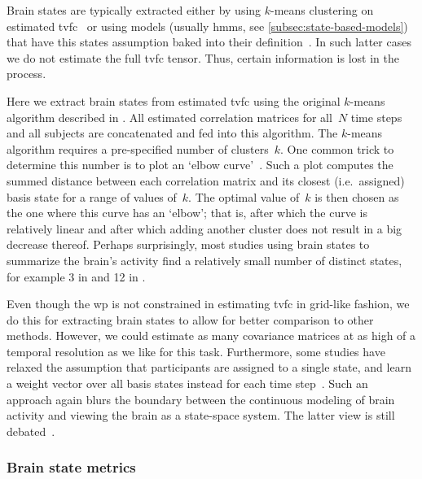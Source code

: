 Brain states are typically extracted either by using $k$-means clustering on estimated \gls{tvfc}~\parencite[see e.g.][]{Allen2014, Abrol2016, Zhi2018, Hakimdavoodi2020} or using models (usually \glspl{hmm}, see \cref{subsec:state-based-models}) that have this states assumption baked into their definition~\parencite{Lurie2020}.
In such latter cases we do not estimate the full \gls{tvfc} tensor.
Thus, certain information is lost in the process.

Here we extract brain states from estimated \gls{tvfc} using the original $k$-means algorithm described in \textcite{Lloyd1982}.
All estimated correlation matrices for all~$N$ time steps and all subjects are concatenated and fed into this algorithm.
The $k$-means algorithm requires a pre-specified number of clusters~$k$.
One common trick to determine this number is to plot an `elbow curve'~\parencite[see e.g.][chapter 5.5]{Everitt2011}.
Such a plot computes the summed distance between each correlation matrix and its closest (i.e.~assigned) basis state for a range of values of~$k$.
The optimal value of~$k$ is then chosen as the one where this curve has an `elbow'; that is, after which the curve is relatively linear and after which adding another cluster does not result in a big decrease thereof.
%
Perhaps surprisingly, most studies using brain states to summarize the brain's activity find a relatively small number of distinct states, for example 3 in \textcite{Choe2017, Dini2021} and 12 in \textcite{Vidaurre2017}.

Even though the \gls{wp} is not constrained in estimating \gls{tvfc} in grid-like fashion, we do this for extracting brain states to allow for better comparison to other methods.
However, we could estimate as many covariance matrices at as high of a temporal resolution as we like for this task.
%
Furthermore, some studies have relaxed the assumption that participants are assigned to a single state, and learn a weight vector over all basis states instead for each time step~\parencite{Leonardi2014}.
Such an approach again blurs the boundary between the continuous modeling of brain activity and viewing the brain as a state-space system.
The latter view is still debated~\parencite[see][for an excellent discussion on the potential and shortcomings of the brain states framework]{Keilholz2017}.

\subsubsection{Brain state metrics}

